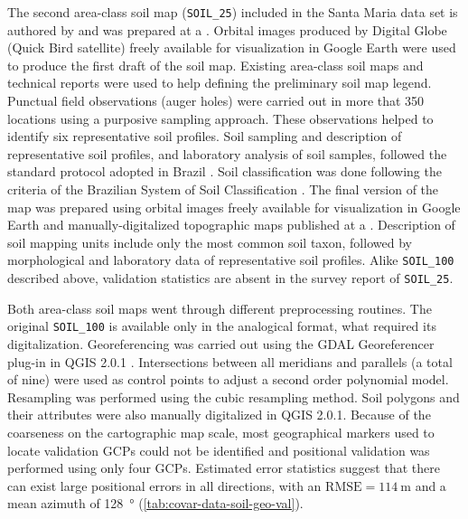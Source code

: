 The second area-class soil map (\texttt{SOIL\_25}) included in the Santa Maria data set is 
authored by \cite{Miguel2010} and was prepared at a . Orbital images produced by 
Digital Globe\textregistered{} (Quick Bird satellite) freely available for visualization in Google 
Earth\textregistered{} were used to produce the first draft of the soil map. Existing area-class 
soil maps and technical reports \cite{Pedron2005,Poelking2007,Sturmer2008} were used to help 
defining the preliminary soil map legend. Punctual field observations (auger holes) were carried 
out in more that \num{350} locations using a purposive sampling approach. These observations helped 
to identify six representative soil profiles. Soil sampling and description of representative soil 
profiles, and laboratory analysis of soil samples, followed the standard protocol adopted in Brazil 
\cite{ClaessenEtAl1997,SantosEtAl2005}. Soil classification was done following the criteria of the 
Brazilian System of Soil Classification \cite{SantosEtAl2006}. The final version of the map was 
prepared using orbital images freely available for visualization in Google Earth\textregistered{} 
and manually-digitalized topographic maps published at a  \cite{DSG1992a,DSG1992}. 
Description of soil mapping units include only the most common soil taxon, followed by morphological 
and laboratory data of representative soil profiles. Alike \texttt{SOIL\_100} described above, 
validation statistics are absent in the survey report of \texttt{SOIL\_25}.

Both area-class soil maps went through different preprocessing routines. The original 
\texttt{SOIL\_100} is available only in the analogical format, what required its digitalization.
Georeferencing was carried out using the GDAL Georeferencer plug-in in QGIS 2.0.1
\cite{GDAL2013,QGIS2013}. Intersections between all meridians and parallels (a total of nine) were 
used as control points to adjust a second order polynomial model. Resampling was performed using the 
cubic resampling method. Soil polygons and their attributes were also manually digitalized in QGIS 
2.0.1. Because of the coarseness on the cartographic map scale, most geographical markers used to 
locate validation GCPs could not be identified and positional validation was performed using only 
four GCPs. Estimated error statistics suggest that there can exist large positional errors in all 
directions, with an $\text{RMSE} = \SI{114}{\m}$ and a mean azimuth of \SI{128}{\degree} 
(\autoref{tab:covar-data-soil-geo-val}).

